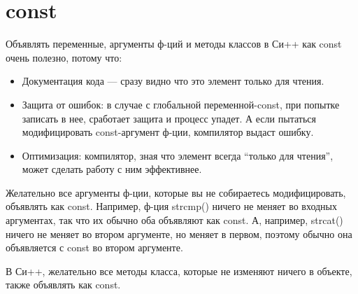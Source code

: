 ﻿\section{const}

Объявлять переменные, аргументы ф-ций и методы классов в Си++ как const очень полезно, потому что:

\begin{itemize}
\item
Документация кода --- сразу видно что это элемент только для чтения.

\item
Защита от ошибок: в случае с глобальной переменной-const, при попытке записать в нее, 
сработает защита и процесс упадет.
А если пытаться модифицировать const-аргумент ф-ции, компилятор выдаст ошибку.

\item
Оптимизация: компилятор, зная что элемент всегда ``только для чтения'', может сделать работу с ним эффективнее.
\end{itemize}

Желательно все аргументы ф-ции, которые вы не собираетесь модифицировать, объявлять как const.
Например, ф-ция strcmp() ничего не меняет во входных аргументах, так что их обычно оба объявляют как const.
А, например, strcat() ничего не меняет во втором аргументе, но меняет в первом, поэтому обычно она объявляется
с const во втором аргументе.

В Си++, желательно все методы класса, которые не изменяют ничего в объекте, также объявлять как const.
